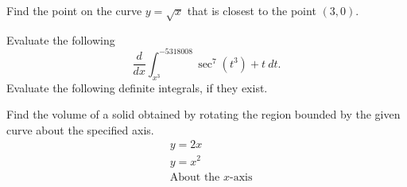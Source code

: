 \documentclass[11pt, addpoints]{exam}
\begin{document}
\begin{questions}
\pagebreak

\question[10] Find the point on the curve $y = \sqrt{x}$ that is closest to the point $(3,0)$.
\vfill

\pagebreak

\question[10] Evaluate the following
\[\frac{d}{dx} \int_{x^3}^{-5318008} \sec^7(t^3) + t \ dt.\]
\vfill
\question Evaluate the following definite integrals, if they exist.

\pagebreak

\question[20] Find the volume of a solid obtained by rotating the region bounded by the given curve about the specified axis.
\begin{align*}
    & y = 2x \\
    & y = x^2\\
    & \text{About the $x$-axis}
\end{align*}
\end{questions}
    
\end{document}
